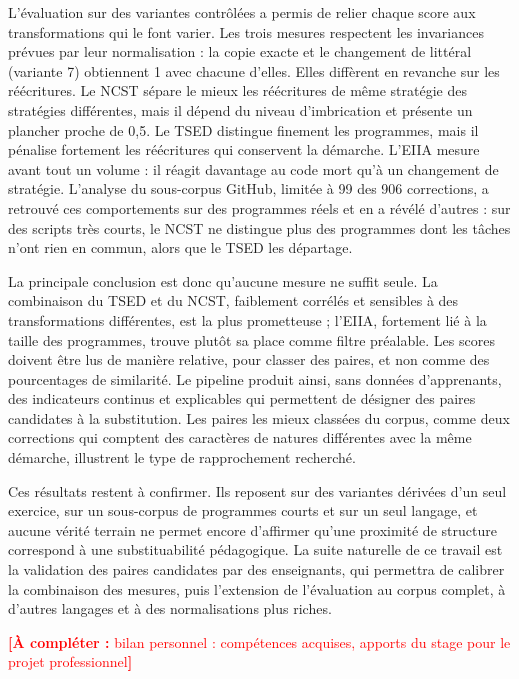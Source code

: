 \documentclass[12pt,a4paper,oneside]{report}
\newcommand{\acompleter}[1]{\textcolor{red}{\textbf{[À compléter :} #1\textbf{]}}}
\begin{document}
L'évaluation sur des variantes contrôlées a permis de relier chaque score
aux transformations qui le font varier. Les trois mesures respectent les
invariances prévues par leur normalisation : la copie exacte et le
changement de littéral (variante 7) obtiennent 1 avec chacune d'elles. Elles diffèrent en revanche sur
les réécritures. Le NCST sépare le mieux les réécritures de même stratégie
des stratégies différentes, mais il dépend du niveau d'imbrication et
présente un plancher proche de 0,5. Le TSED distingue finement les
programmes, mais il pénalise fortement les réécritures qui conservent la
démarche. L'EIIA mesure avant tout un volume : il réagit davantage au code
mort qu'à un changement de stratégie. L'analyse du sous-corpus GitHub, limitée
à 99 des 906 corrections, a retrouvé ces comportements sur des programmes
réels et en a révélé d'autres : sur des scripts très courts, le NCST ne distingue plus des programmes
dont les tâches n'ont rien en commun, alors que le TSED les départage.

La principale conclusion est donc qu'aucune mesure ne suffit seule. La
combinaison du TSED et du NCST, faiblement corrélés et sensibles à des
transformations différentes, est la plus prometteuse ; l'EIIA, fortement
lié à la taille des programmes, trouve plutôt sa place comme filtre
préalable. Les scores doivent être lus de manière relative, pour classer
des paires, et non comme des pourcentages de similarité. Le pipeline
produit ainsi, sans données d'apprenants, des indicateurs continus et
explicables qui permettent de désigner des paires candidates à la
substitution. Les paires les mieux classées du corpus,
comme deux corrections qui comptent des caractères de natures différentes
avec la même démarche, illustrent le type de rapprochement recherché.

Ces résultats restent à confirmer. Ils reposent sur des variantes dérivées
d'un seul exercice, sur un sous-corpus de programmes courts et sur un seul
langage, et aucune vérité terrain ne permet encore d'affirmer qu'une
proximité de structure correspond à une substituabilité pédagogique. La
suite naturelle de ce travail est la validation des paires candidates par
des enseignants, qui permettra de calibrer la combinaison des mesures,
puis l'extension de l'évaluation au corpus complet, à d'autres langages et
à des normalisations plus riches.

\acompleter{bilan personnel : compétences acquises, apports du stage pour
le projet professionnel}

\printbibliography[heading=bibintoc,nottype=online,title={Bibliographie}]
\printbibliography[heading=bibintoc,type=online,title={Webographie}]
\end{document}
